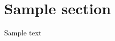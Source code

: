 \documentclass[a4paper]{article}
\begin{document}
    
\tableofcontents

\section{Sample section}

Sample text

\printbibliography
\end{document}
